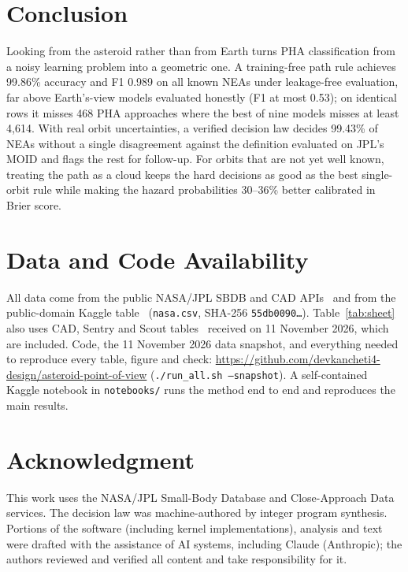 \documentclass[conference]{IEEEtran}
\begin{document}
\section{Conclusion}
Looking from the asteroid rather than from Earth turns PHA classification from a noisy learning problem into a geometric one. A training-free path rule achieves 99.86\% accuracy and F1 0.989 on all known NEAs under leakage-free evaluation, far above Earth's-view models evaluated honestly (F1 at most 0.53); on identical rows it misses 468 PHA approaches where the best of nine models misses at least 4,614. With real orbit uncertainties, a verified decision law decides 99.43\% of NEAs without a single disagreement against the definition evaluated on JPL's MOID and flags the rest for follow-up. For orbits that are not yet well known, treating the path as a cloud keeps the hard decisions as good as the best single-orbit rule while making the hazard probabilities 30--36\% better calibrated in Brier score.



\section*{Data and Code Availability}
All data come from the public NASA/JPL SBDB and CAD APIs~\cite{jpl_sbdb_api,jpl_cad_api} and from the public-domain Kaggle table~\cite{kaggle_nasa} (\texttt{nasa.csv}, SHA-256 \texttt{55db0090\ldots}). Table~\ref{tab:sheet} also uses CAD, Sentry and Scout tables~\cite{jpl_cad_api,jpl_sentry_api,jpl_scout_api} received on 11 November 2026, which are included. Code, the 11 November 2026 data snapshot, and everything needed to reproduce every table, figure and check: \url{https://github.com/devkancheti4-design/asteroid-point-of-view} (\texttt{./run\_all.sh --snapshot}). A self-contained Kaggle notebook in \texttt{notebooks/} runs the method end to end and reproduces the main results.

\section*{Acknowledgment}
This work uses the NASA/JPL Small-Body Database and Close-Approach Data services. The decision law was machine-authored by integer program synthesis. Portions of the software (including kernel implementations), analysis and text were drafted with the assistance of AI systems, including Claude (Anthropic); the authors reviewed and verified all content and take responsibility for it.



\end{document}
